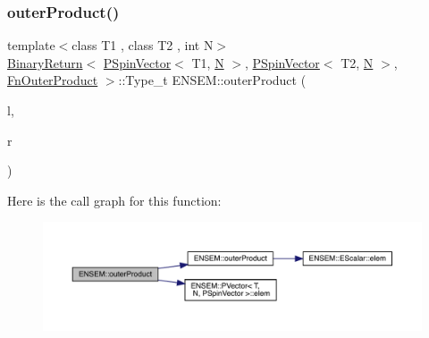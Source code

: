 \subsubsection{\texorpdfstring{outerProduct()}{outerProduct()}}
{\footnotesize\ttfamily template$<$class T1 , class T2 , int N$>$ \\
\mbox{\hyperlink{structENSEM_1_1BinaryReturn}{Binary\+Return}}$<$ \mbox{\hyperlink{classENSEM_1_1PSpinVector}{P\+Spin\+Vector}}$<$ T1, \mbox{\hyperlink{adat__devel_2lib_2hadron_2operator__name__util_8cc_a7722c8ecbb62d99aee7ce68b1752f337}{N}} $>$, \mbox{\hyperlink{classENSEM_1_1PSpinVector}{P\+Spin\+Vector}}$<$ T2, \mbox{\hyperlink{adat__devel_2lib_2hadron_2operator__name__util_8cc_a7722c8ecbb62d99aee7ce68b1752f337}{N}} $>$, \mbox{\hyperlink{structENSEM_1_1FnOuterProduct}{Fn\+Outer\+Product}} $>$\+::Type\+\_\+t E\+N\+S\+E\+M\+::outer\+Product (\begin{DoxyParamCaption}\item[{const \mbox{\hyperlink{classENSEM_1_1PSpinVector}{P\+Spin\+Vector}}$<$ T1, \mbox{\hyperlink{adat__devel_2lib_2hadron_2operator__name__util_8cc_a7722c8ecbb62d99aee7ce68b1752f337}{N}} $>$ \&}]{l,  }\item[{const \mbox{\hyperlink{classENSEM_1_1PSpinVector}{P\+Spin\+Vector}}$<$ T2, \mbox{\hyperlink{adat__devel_2lib_2hadron_2operator__name__util_8cc_a7722c8ecbb62d99aee7ce68b1752f337}{N}} $>$ \&}]{r }\end{DoxyParamCaption})\hspace{0.3cm}{\ttfamily [inline]}}

Here is the call graph for this function\+:\nopagebreak
\begin{figure}[H]
\begin{center}
\leavevmode
\includegraphics[width=350pt]{d6/df5/group__primspinmatrix_ga6ff39d20fc8369664c9b3849e00d654d_cgraph}
\end{center}
\end{figure}
\mbox{\label{group__primspinmatrix_ga2af6db806ff17a39ca84960a216d33c7}} 
